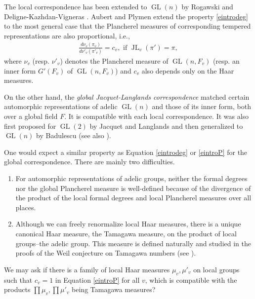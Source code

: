 \documentclass[11pt]{article}
\theoremstyle{plain}
\theoremstyle{remark}
\theoremstyle{definition}
\DeclareMathOperator{\GL}{GL}
\DeclareMathOperator{\JL}{JL}
\begin{document}
The local correspondence has been extended to $\GL(n)$ by Rogawski \cite{Rog80} and Deligne-Kazhdan-Vigneras \cite{DKV84}.  
Aubert and Plymen extend the property \eqref{eintrodeg} to the most general case that the Plancherel measures of corresponding tempered representations are also proportional, i.e.,
\begin{equation}\label{eintroP}
\begin{aligned}
    \frac{d \nu_{v}(\pi_v)}{d \nu'_{v}(\pi'_v)}=c_v, \text{~if~} \JL_{v}(\pi')=\pi,
\end{aligned}
\end{equation}
where $\nu_v$ (resp. $\nu'_v$) denotes the Plancherel measure of $\GL(n,F_v)$ (resp. an inner form $G'(F_v)$ of $\GL(n,F_v)$) and $c_v$ also depends only on the Haar measures.

On the other hand, the {\it global Jacquet-Langlands correspondence} matched certain automorphic representations of adelic $\GL(n)$ and those of its inner form, both over a global field $F$.
It is compatible with each local correspondence. 
It was also first proposed for $\GL(2)$ by Jacquet and Langlands and then generalized to $\GL(n)$ by Badulescu \cite{Badu08} (see also \cite{BaduRena10,BaduRoch2017}). 

One would expect a similar property as Equation \eqref{eintrodeg} or \eqref{eintroP} for the global correspondence. 
There are mainly two difficulties. 
\begin{enumerate}
    \item For automorphic representations of adelic groups, neither the formal degrees nor the global Plancherel measure is well-defined because of the divergence of the product of the local formal degrees and local Plancherel measures over all places. 
    \item Although we can freely renormalize local Haar measures, there is a unique canonical Haar measure, the Tamagawa measure, on the product of local groups--the adelic group. 
    This measure is defined naturally and studied in the proofs of the Weil conjecture on Tamagawa numbers (see \cite{Kott88}). 
\end{enumerate}
We may ask if there is a family of local Haar measures $\mu_v,\mu'_v$ on local groups such that $c_v=1$ in Equation \eqref{eintroP} for all $v$, which is compatible with the products $\prod\mu_v,\prod\mu'_v$ being Tamagawa measures?
\end{document}
